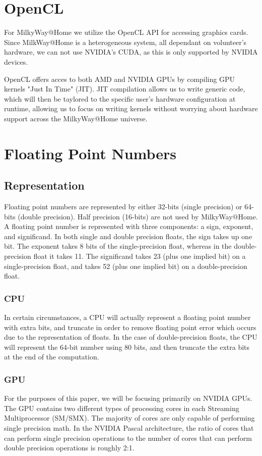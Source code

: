 \documentclass[fleqn,10pt]{SelfArx} %
\begin{document}
\section{OpenCL}
For MilkyWay@Home we utilize the OpenCL API for accessing graphics cards. Since MilkWay@Home is a heterogeneous system, all dependant on volunteer's hardware, we can not use NVIDIA's CUDA, as this is only supported by NVIDIA devices.

OpenCL offers acces to both AMD and NVIDIA GPUs by compiling GPU kernels "Just In Time" (JIT). JIT compilation allows us to write generic code, which will then be taylored to the specific user's hardware configuration at runtime, allowing us to focus on writing kernels without worrying about hardware support across the MilkyWay@Home universe.

\section{Floating Point Numbers}
    \subsection{Representation}
    Floating point numbers are represented by either 32-bits (single precision) or 64-bits (double precision). Half precision (16-bits) are not used by MilkyWay@Home. A floating point number is represented with three components: a sign, exponent, and significand. In both single and double precision floats, the sign takes up one bit. The exponent takes 8 bits of the single-precision float, whereas in the double-precision float it takes 11. The significand takes 23 (plus one implied bit) on a single-precision float, and takes 52 (plus one implied bit) on a double-precision float.
        \subsubsection{CPU}
        In certain circumstances, a CPU will actually represent a floating point number with extra bits, and truncate in order to remove floating point error which occurs due to the representation of floats. In the case of double-precision floats, the CPU will represent the 64-bit number using 80 bits, and then truncate the extra bits at the end of the computation.
        \subsubsection{GPU}
        For the purposes of this paper, we will be focusing primarily on NVIDIA GPUs. The GPU contains two different types of processing cores in each Streaming Multiprocessor (SM/SMX). The majority of cores are only capable of performing single precision math. In the NVIDIA Pascal architecture, the ratio of cores that can perform single precision operations to the number of cores that can perform double precision operations is roughly 2:1. 
\end{document}
